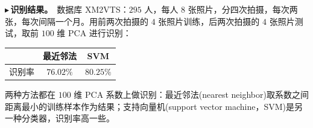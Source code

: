 \documentclass[UTF8,a4paper,11pt]{ctexart}
\newcounter{ex}[section]
\newcommand{\point}[1]{\par\addvspace{1ex}\noindent\textcolor{ptteal}{$\blacktriangleright$\,\textbf{#1}}\ }
\begin{document}
\point{识别结果。}数据库 XM2VTS：$295$ 人，每人 $8$ 张照片，分四次拍摄，每次两张，每次间隔一个月。用前两次拍摄的 $4$ 张照片训练，后两次拍摄的 $4$ 张照片测试，取前 $100$ 维 PCA 进行识别：
\begin{center}
\begin{tabular}{lcc}
\toprule
 & 最近邻法 & SVM\\
\midrule
识别率 & $76.02\%$ & $80.25\%$\\
\bottomrule
\end{tabular}
\end{center}
两种方法都在 $100$ 维 PCA 系数上做识别：最近邻法(nearest neighbor)取系数之间距离最小的训练样本作为结果；支持向量机(support vector machine，SVM)是另一种分类器，识别率高一些。
\end{document}
